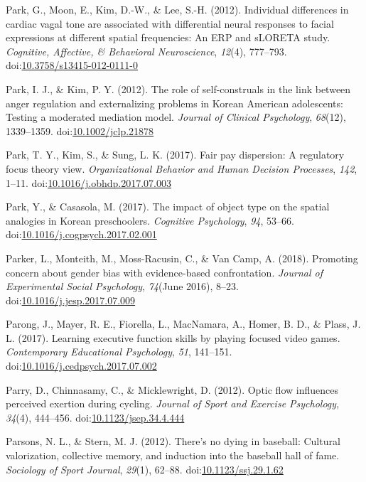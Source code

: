 \documentclass[english,man]{apa6}
\theoremstyle{definition}
\theoremstyle{definition}
\theoremstyle{definition}
\theoremstyle{remark}
\begin{document}
\hypertarget{ref-Park2012}{}
Park, G., Moon, E., Kim, D.-W., \& Lee, S.-H. (2012). Individual
differences in cardiac vagal tone are associated with differential
neural responses to facial expressions at different spatial frequencies:
An ERP and sLORETA study. \emph{Cognitive, Affective, \& Behavioral
Neuroscience}, \emph{12}(4), 777--793.
doi:\href{https://doi.org/10.3758/s13415-012-0111-0}{10.3758/s13415-012-0111-0}

\hypertarget{ref-Park2012a}{}
Park, I. J., \& Kim, P. Y. (2012). The role of self-construals in the
link between anger regulation and externalizing problems in Korean
American adolescents: Testing a moderated mediation model. \emph{Journal
of Clinical Psychology}, \emph{68}(12), 1339--1359.
doi:\href{https://doi.org/10.1002/jclp.21878}{10.1002/jclp.21878}

\hypertarget{ref-Park2017}{}
Park, T. Y., Kim, S., \& Sung, L. K. (2017). Fair pay dispersion: A
regulatory focus theory view. \emph{Organizational Behavior and Human
Decision Processes}, \emph{142}, 1--11.
doi:\href{https://doi.org/10.1016/j.obhdp.2017.07.003}{10.1016/j.obhdp.2017.07.003}

\hypertarget{ref-Park2017a}{}
Park, Y., \& Casasola, M. (2017). The impact of object type on the
spatial analogies in Korean preschoolers. \emph{Cognitive Psychology},
\emph{94}, 53--66.
doi:\href{https://doi.org/10.1016/j.cogpsych.2017.02.001}{10.1016/j.cogpsych.2017.02.001}

\hypertarget{ref-Parker2018}{}
Parker, L., Monteith, M., Moss-Racusin, C., \& Van Camp, A. (2018).
Promoting concern about gender bias with evidence-based confrontation.
\emph{Journal of Experimental Social Psychology}, \emph{74}(June 2016),
8--23.
doi:\href{https://doi.org/10.1016/j.jesp.2017.07.009}{10.1016/j.jesp.2017.07.009}

\hypertarget{ref-Parong2017}{}
Parong, J., Mayer, R. E., Fiorella, L., MacNamara, A., Homer, B. D., \&
Plass, J. L. (2017). Learning executive function skills by playing
focused video games. \emph{Contemporary Educational Psychology},
\emph{51}, 141--151.
doi:\href{https://doi.org/10.1016/j.cedpsych.2017.07.002}{10.1016/j.cedpsych.2017.07.002}

\hypertarget{ref-Parry2012}{}
Parry, D., Chinnasamy, C., \& Micklewright, D. (2012). Optic flow
influences perceived exertion during cycling. \emph{Journal of Sport and
Exercise Psychology}, \emph{34}(4), 444--456.
doi:\href{https://doi.org/10.1123/jsep.34.4.444}{10.1123/jsep.34.4.444}

\hypertarget{ref-Parsons2012}{}
Parsons, N. L., \& Stern, M. J. (2012). There's no dying in baseball:
Cultural valorization, collective memory, and induction into the
baseball hall of fame. \emph{Sociology of Sport Journal}, \emph{29}(1),
62--88.
doi:\href{https://doi.org/10.1123/ssj.29.1.62}{10.1123/ssj.29.1.62}
\end{document}
